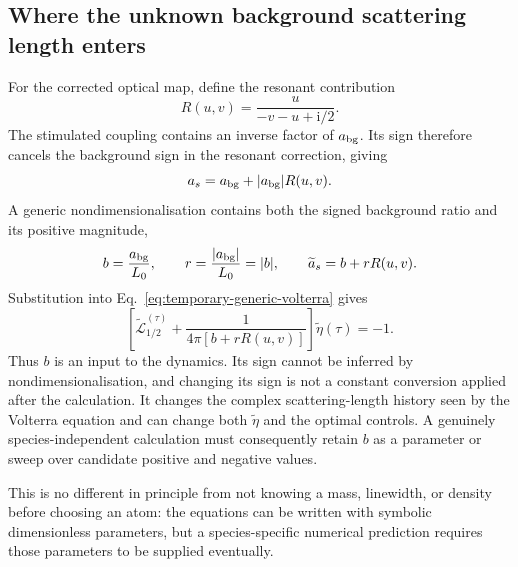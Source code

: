 \documentclass[9pt,a4paper,twocolumn,twoside]{rho-class/rho}
\newcommand{\ii}{\mathrm{i}}
\begin{document}
    \subsection{Where the unknown background scattering length enters}

        For the corrected optical map, define the resonant contribution
        \begin{equation}\label{eq:temporary-optical-factor}
            R(u,v)=\frac{u}{-v-u+\ii/2}.
        \end{equation}
        The stimulated coupling contains an inverse factor of
        $a_{\rm bg}$.  Its sign therefore cancels the background sign in the
        resonant correction, giving
        \begin{equation}
            a_s=a_{\rm bg}+|a_{\rm bg}|R(u,v).
        \end{equation}
        A generic nondimensionalisation contains both the signed background
        ratio and its positive magnitude,
        \begin{equation}\label{eq:temporary-background-ratio}
            b=\frac{a_{\rm bg}}{L_0},
            \qquad r=\frac{|a_{\rm bg}|}{L_0}=|b|,
            \qquad \widetilde a_s=b+rR(u,v).
        \end{equation}
        Substitution into Eq.~\eqref{eq:temporary-generic-volterra} gives
        \begin{equation}\label{eq:temporary-volterra-with-background}
            \left[
                \widetilde{\mathcal L}_{1/2}^{(\tau)}
                +\frac{1}{4\pi[b+rR(u,v)]}
            \right]\widetilde\eta(\tau)=-1.
        \end{equation}
        Thus $b$ is an input to the dynamics.  Its sign cannot be inferred by
        nondimensionalisation, and changing its sign is not a constant
        conversion applied after the calculation.  It changes the complex
        scattering-length history seen by the Volterra equation and can change
        both $\widetilde\eta$ and the optimal controls.  A genuinely
        species-independent calculation must consequently retain $b$ as a
        parameter or sweep over candidate positive and negative values.

        This is no different in principle from not knowing a mass, linewidth,
        or density before choosing an atom: the equations can be written with
        symbolic dimensionless parameters, but a species-specific numerical
        prediction requires those parameters to be supplied eventually.
\end{document}
